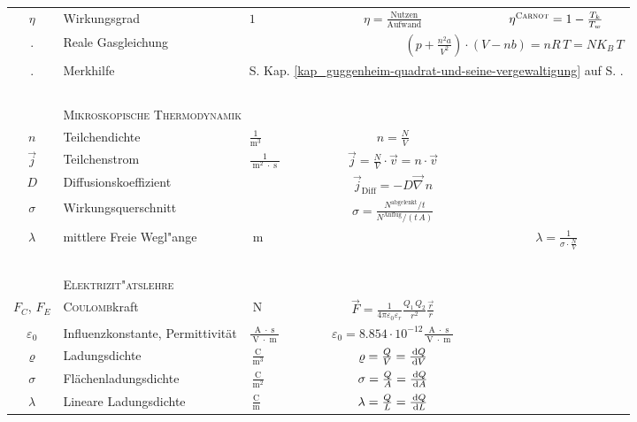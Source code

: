 \begin{landscape}
\begin{longtable}{c l l c c}
$\eta$ & Wirkungsgrad & $1$ & $\eta =
\frac{\text{Nutzen}}{\text{Aufwand}}$ & $\eta^\text{\textsc{Carnot}} =
1  -\frac{T_k}{T_w}$\\
. & Reale Gasgleichung & \multicolumn{3}{r}{$\left ( p + \frac{n^2
       a}{V^2} \right ) \cdot \left ( V - n b \right ) = n R \, T = N
  K_B \, T$}\\
. & Merkhilfe &
\multicolumn{3}{r}{S. Kap. \ref{kap_guggenheim-quadrat-und-seine-vergewaltigung}
  auf S. \pageref{kap_guggenheim-quadrat-und-seine-vergewaltigung}.}\\
%
\hline
~\\
%
%
%
~ & \multicolumn{3}{l}{\textsc{Mikroskopische Thermodynamik}}\\
%
$n$ & Teilchendichte & $\frac{1}{\operatorname{m}^3}$ & $n = \frac{N}{V}$\\
$\vec j$ & Teilchenstrom & $\frac{1}{\operatorname{m}^2 \cdot
  \operatorname{s}}$ & $\vec j = \frac{N}{V}\cdot \vec v = n \cdot
\vec v$\\
$D$ & Diffusionskoeffizient & ~ & $\vec j_\text{Diff} = -D \vec\nabla \, n$\\
$\sigma$ & Wirkungsquerschnitt & ~ & $\sigma =\frac{N^\text{abgelenkt}
/ t}{N^\text{Anflug}/ (t\, A)}$\\
$\lambda$ & mittlere Freie Wegl"ange & $\operatorname{m}$ & ~ &$\lambda =
\frac{1}{\sigma \cdot \frac{N}{V}}$\\
%
%
\hline
~ \\
%
%
%
~ & \textsc{Elektrizit"atslehre} \\
$F_C$, $F_E$ & \textsc{Coulomb}kraft & $\operatorname{N}$ & $\vec F =
\frac{1}{4\pi \varepsilon_0\varepsilon_r} \frac{Q_1\,
  Q_2}{r^2}\frac{\vec r}{r}$\\
$\varepsilon_0$ & Influenzkonstante, Permittivität &
$\frac{\operatorname{A}\cdot \operatorname{s}}{\operatorname{V}\cdot
  \operatorname{m}}$ & $\varepsilon_0 = 8.854 \cdot
10^{-12}\frac{\operatorname{A}\cdot
  \operatorname{s}}{\operatorname{V}\cdot
  \operatorname{m}}$\\
$\varrho$ & Ladungsdichte &
$\frac{\operatorname{C}}{\operatorname{m}^3}$ & $\varrho = \frac{Q}{V}
= \frac{\, \mathrm{d} Q}{\, \mathrm{d} V}$\\
$\sigma$ & Flächenladungsdichte &
$\frac{\operatorname{C}}{\operatorname{m}^2}$ & $\sigma = \frac{Q}{A}
= \frac{\, \mathrm{d} Q}{\, \mathrm{d} A}$\\
$\lambda$ & Lineare Ladungsdichte &
$\frac{\operatorname{C}}{\operatorname{m}}$ & $\lambda = \frac{Q}{L}
= \frac{\, \mathrm{d} Q}{\, \mathrm{d} L}$\\

\end{longtable}
\end{landscape}

